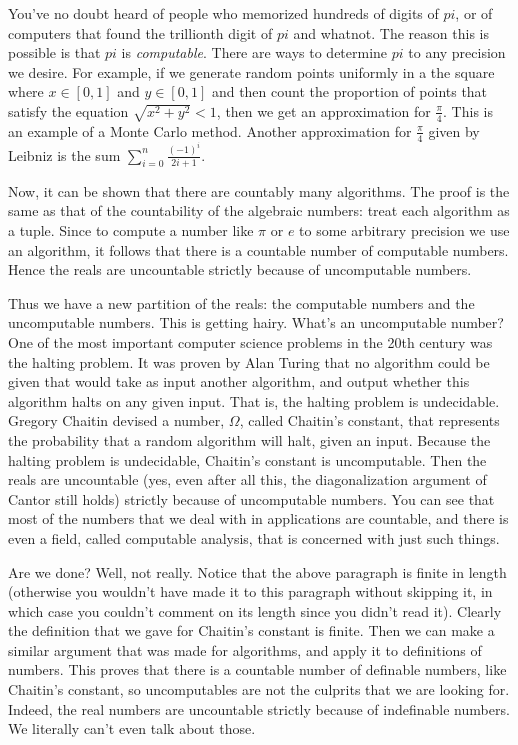 \documentclass[letterpaper]{article}
\numberwithin{equation}{section}
\begin{document}
You've no doubt heard of people who memorized hundreds of digits of $pi$, or of computers that found the trillionth digit of $pi$ and whatnot. The reason this is possible is that $pi$ is \textit{computable}. There are ways to determine $pi$ to any precision we desire. For example, if we generate random points uniformly in a the square where $x\in[0,1]$ and $y\in[0,1]$ and then count the proportion of points that satisfy the equation $\sqrt{x^2+y^2}<1$, then we get an approximation for $\frac{\pi}{4}$. This is an example of a Monte Carlo method. Another approximation for $\frac{\pi}{4}$ given by Leibniz is the sum $\sum_{i=0}^n\frac{(-1)^{i}}{2i+1}$.

Now, it can be shown that there are countably many algorithms. The proof is the same as that of the countability of the algebraic numbers: treat each algorithm as a tuple. Since to compute a number like $\pi$ or $e$ to some arbitrary precision we use an algorithm, it follows that there is a countable number of computable numbers. Hence the reals are uncountable strictly because of uncomputable numbers.

Thus we have a new partition of the reals: the computable numbers and the uncomputable numbers. This is getting hairy. What's an uncomputable number? One of the most important computer science problems in the 20th century was the halting problem. It was proven by Alan Turing that no algorithm could be given that would take as input another algorithm, and output whether this algorithm halts on any given input. That is, the halting problem is undecidable. Gregory Chaitin devised a number, $\Omega$, called Chaitin's constant, that represents the probability that a random algorithm will halt, given an input. Because the halting problem is undecidable, Chaitin's constant is uncomputable. Then the reals are uncountable (yes, even after all this, the diagonalization argument of Cantor still holds) strictly because of uncomputable numbers. You can see that most of the numbers that we deal with in applications are countable, and there is even a field, called computable analysis, that is concerned with just such things.

Are we done? Well, not really. Notice that the above paragraph is finite in length (otherwise you wouldn't have made it to this paragraph without skipping it, in which case you couldn't comment on its length since you didn't read it). Clearly the definition that we gave for Chaitin's constant is finite. Then we can make a similar argument that was made for algorithms, and apply it to definitions of numbers. This proves that there is a countable number of definable numbers, like Chaitin's constant, so uncomputables are not the culprits that we are looking for. Indeed, the real numbers are uncountable strictly because of indefinable numbers. We literally can't even talk about those.
\end{document}
